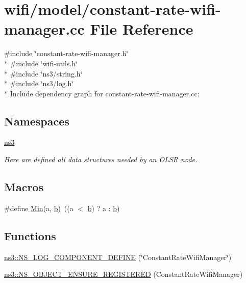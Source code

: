 \hypertarget{constant-rate-wifi-manager_8cc}{}\section{wifi/model/constant-\/rate-\/wifi-\/manager.cc File Reference}
\label{constant-rate-wifi-manager_8cc}
{\ttfamily \#include \char`\"{}constant-\/rate-\/wifi-\/manager.\+h\char`\"{}}\\*
{\ttfamily \#include \char`\"{}wifi-\/utils.\+h\char`\"{}}\\*
{\ttfamily \#include \char`\"{}ns3/string.\+h\char`\"{}}\\*
{\ttfamily \#include \char`\"{}ns3/log.\+h\char`\"{}}\\*
Include dependency graph for constant-\/rate-\/wifi-\/manager.cc\+:
\subsection*{Namespaces}
\begin{DoxyCompactItemize}
\item 
 \hyperlink{namespacens3}{ns3}
\begin{DoxyCompactList}\small\item\em Here are defined all data structures needed by an O\+L\+SR node. \end{DoxyCompactList}\end{DoxyCompactItemize}
\subsection*{Macros}
\begin{DoxyCompactItemize}
\item 
\#define \hyperlink{constant-rate-wifi-manager_8cc_a9e04209162ea72f9985338596262b657}{Min}(a,  \hyperlink{lte__pathloss_8m_a21ad0bd836b90d08f4cf640b4c298e7c}{b})~((a $<$ \hyperlink{lte__pathloss_8m_a21ad0bd836b90d08f4cf640b4c298e7c}{b}) ? a \+: \hyperlink{lte__pathloss_8m_a21ad0bd836b90d08f4cf640b4c298e7c}{b})
\end{DoxyCompactItemize}
\subsection*{Functions}
\begin{DoxyCompactItemize}
\item 
\hyperlink{namespacens3_acd8ff2d159a63ef38b7095d60db6384b}{ns3\+::\+N\+S\+\_\+\+L\+O\+G\+\_\+\+C\+O\+M\+P\+O\+N\+E\+N\+T\+\_\+\+D\+E\+F\+I\+NE} (\char`\"{}Constant\+Rate\+Wifi\+Manager\char`\"{})
\item 
\hyperlink{namespacens3_a9fce808f84d79356ae295dd5af27e238}{ns3\+::\+N\+S\+\_\+\+O\+B\+J\+E\+C\+T\+\_\+\+E\+N\+S\+U\+R\+E\+\_\+\+R\+E\+G\+I\+S\+T\+E\+R\+ED} (Constant\+Rate\+Wifi\+Manager)
\end{DoxyCompactItemize}


